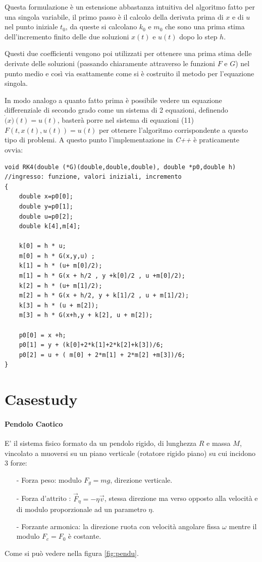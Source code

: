 \documentclass[11pt]{article}
\begin{document}
Questa formulazione è un estensione abbastanza intuitiva del algoritmo fatto per una singola variabile, il primo passo è il calcolo della derivata prima di $x$ e di $u$ nel punto iniziale $t_{0}$, da queste si calcolano $k_{0}$ e $m_{0}$ che sono una prima stima dell'incremento finito delle due soluzioni $x(t)$ e $u(t)$ dopo lo step $h$.

Questi due coefficienti vengono poi utilizzati per ottenere una prima stima delle derivate delle soluzioni (passando chiaramente attraverso le funzioni $F$ e $G$) nel punto medio e così via esattamente come si è costruito il metodo per l'equazione singola.

In modo analogo a quanto fatto prima è possibile vedere un equazione differenziale di secondo grado come un sistema di 2 equazioni, definendo $\dot(x)(t) = u(t)$, basterà porre nel sistema di equazioni (11) $F(t, x(t), u(t)) =u(t)$ per ottenere l'algoritmo corrispondente a questo tipo di problemi.
A questo punto l'implementazione in \emph{C++} è praticamente ovvia:

\begin{lstlisting}[frame=single]
void RK4(double (*G)(double,double,double), double *p0,double h) //ingresso: funzione, valori iniziali, incremento
{
	double x=p0[0];
	double y=p0[1];
	double u=p0[2];
	double k[4],m[4];

	k[0] = h * u;
	m[0] = h * G(x,y,u) ;
	k[1] = h * (u+ m[0]/2);
	m[1] = h * G(x + h/2 , y +k[0]/2 , u +m[0]/2);
	k[2] = h * (u+ m[1]/2);
	m[2] = h * G(x + h/2, y + k[1]/2 , u + m[1]/2);
	k[3] = h * (u + m[2]);
	m[3] = h * G(x+h,y + k[2], u + m[2]);
	
	p0[0] = x +h;
	p0[1] = y + (k[0]+2*k[1]+2*k[2]+k[3])/6;
	p0[2] = u + ( m[0] + 2*m[1] + 2*m[2] +m[3])/6;
}
\end{lstlisting}

\section{Casestudy}
\paragraph{Pendolo Caotico}
E' il sistema fisico formato da un pendolo rigido, di lunghezza $R$ e massa $M$, vincolato a muoversi su un piano verticale (rotatore rigido piano) su cui incidono 3 forze:
\begin{itemize}
	\item[-] Forza peso: modulo $ F_{g} = mg$, direzione verticale.
	\item[-] Forza d'attrito : $ \vec{F}_{\eta} = - \eta \vec{v}$, stessa direzione ma verso opposto alla velocità e di modulo proporzionale ad un parametro $\eta$.
	\item[-] Forzante armonica: la direzione ruota con velocità angolare fissa $\omega$ mentre il modulo $ F_{c} = F_{0}$ è costante.
	\end{itemize}
Come si può vedere nella figura \ref{fig:pendu}.
 
\end{document}
